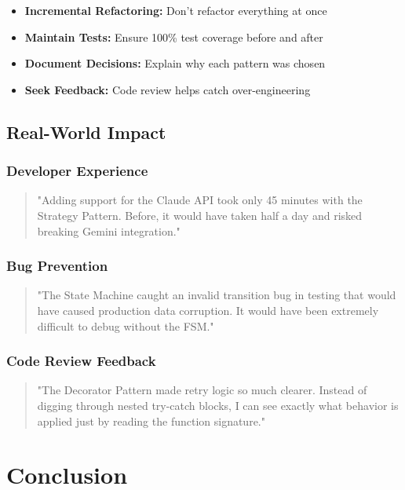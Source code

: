 \documentclass[11pt,a4paper]{article}
\begin{document}
\begin{itemize}
    \item \textbf{Incremental Refactoring:} Don't refactor everything at once
    \item \textbf{Maintain Tests:} Ensure 100\% test coverage before and after
    \item \textbf{Document Decisions:} Explain why each pattern was chosen
    \item \textbf{Seek Feedback:} Code review helps catch over-engineering
\end{itemize}

\subsection{Real-World Impact}

\subsubsection{Developer Experience}

\begin{quote}
"Adding support for the Claude API took only 45 minutes with the Strategy Pattern. Before, it would have taken half a day and risked breaking Gemini integration."
\end{quote}

\subsubsection{Bug Prevention}

\begin{quote}
"The State Machine caught an invalid transition bug in testing that would have caused production data corruption. It would have been extremely difficult to debug without the FSM."
\end{quote}

\subsubsection{Code Review Feedback}

\begin{quote}
"The Decorator Pattern made retry logic so much clearer. Instead of digging through nested try-catch blocks, I can see exactly what behavior is applied just by reading the function signature."
\end{quote}

\newpage

\section{Conclusion}
\end{document}

